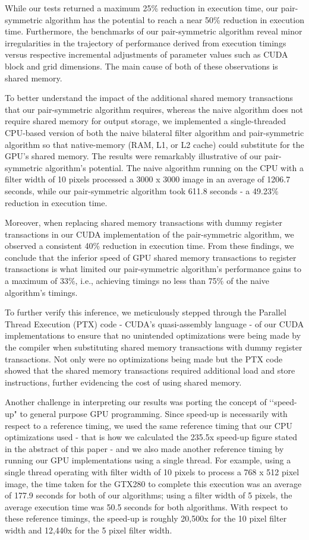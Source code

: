 \documentclass{IEEEtran}
\begin{document}
While our tests returned a maximum 25\% reduction in execution time, our pair-symmetric algorithm has the potential to reach a near 50\% reduction in execution time. Furthermore, the benchmarks of our pair-symmetric algorithm reveal minor irregularities in the trajectory of performance derived from execution timings versus respective incremental adjustments of parameter values such as CUDA block and grid dimensions. The main cause of both of these observations is shared memory. 

To better understand the impact of the additional shared memory transactions that our pair-symmetric algorithm requires, whereas the naive algorithm does not require shared memory for output storage, we implemented a single-threaded CPU-based version of both the naive bilateral filter algorithm and pair-symmetric algorithm so that native-memory (RAM, L1, or L2 cache) could substitute for the GPU's shared memory. The results were remarkably illustrative of our pair-symmetric algorithm's potential. The naive algorithm running on the CPU with a filter width of 10 pixels processed a 3000 x 3000 image in an average of 1206.7 seconds, while our pair-symmetric algorithm took 611.8 seconds - a 49.23\% reduction in execution time. 

Moreover, when replacing shared memory transactions with dummy register transactions in our CUDA implementation of the pair-symmetric algorithm, we observed a consistent 40\% reduction in execution time. From these findings, we conclude that the inferior speed of GPU shared memory transactions to register transactions is what limited our pair-symmetric algorithm's performance gains to  a maximum of 33\%, i.e., achieving timings no less than 75\% of the naive algorithm's timings. 

To further verify this inference, we meticulously stepped through the Parallel Thread Execution (PTX) code - CUDA's quasi-assembly language - of our CUDA implementations to ensure that no unintended optimizations were being made by the compiler when substituting shared memory transactions with dummy register transactions. Not only were no optimizations being made but the PTX code showed that the shared memory transactions required additional load and store instructions, further evidencing the cost of using shared memory.

Another challenge in interpreting our results was porting the concept of \lq{}\lq{}speed-up" to general purpose GPU programming. Since speed-up is necessarily with respect to a reference timing, we used the same reference timing that our CPU optimizations used - that is how we calculated the 235.5x speed-up figure stated in the abstract of this paper - and we also made another reference timing by running our GPU implementations using a single thread. For example, using a single thread operating with filter width of 10 pixels to process a 768 x 512 pixel image, the time taken for the GTX280 to complete this execution was an average of 177.9 seconds for both of our algorithms; using a filter width of 5 pixels, the average execution time was 50.5 seconds for both algorithms. With respect to these reference timings, the speed-up is roughly 20,500x for the 10 pixel filter width and 12,440x for the 5 pixel filter width.
\end{document}
